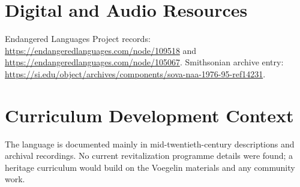 \documentclass[12pt]{article}
\begin{document}
\section{Digital and Audio Resources}
Endangered Languages Project records: \url{https://endangeredlanguages.com/node/109518} and \url{https://endangeredlanguages.com/node/105067}. Smithsonian archive entry: \url{https://si.edu/object/archives/components/sova-naa-1976-95-ref14231}.

\section{Curriculum Development Context}
The language is documented mainly in mid-twentieth-century descriptions and archival recordings. No current revitalization programme details were found; a heritage curriculum would build on the Voegelin materials and any community work.
\end{document}
